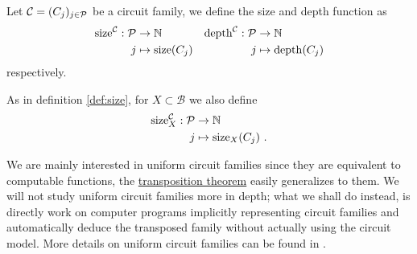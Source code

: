 \begin{definition}
  Let $\mathcal{C} = (C_j)_{j\in\mathcal{P}}$ be a circuit family, we
  define the size and
  depth function as
  \begin{align*}
    \operatorname{size}^{\mathcal{C}}:\mathcal{P}&\rightarrow\mathbb{N}  & \operatorname{depth}^{\mathcal{C}}:\mathcal{P}&\rightarrow\mathbb{N}\\
                   j&\mapsto\operatorname{size}(C_j) &    j&\mapsto\operatorname{depth}(C_j)
  \end{align*}
  respectively.

  As in definition \ref{def:size}, for $X\subset\mathcal{B}$ we also
  define
  \begin{align*}
    \operatorname{size}^{\mathcal{C}}_X:\mathcal{P}&\rightarrow\mathbb{N}\\
                     j&\mapsto\operatorname{size}_X(C_j)
                     \text{ .}
  \end{align*}
\end{definition}

We are mainly interested in uniform circuit families since they are
equivalent to computable functions, the
\hyperref[th:tellegen]{transposition theorem} easily generalizes to
them. We will not study uniform circuit families more in depth; what
we shall do instead, is directly work on computer programs implicitly
representing circuit families and automatically deduce the transposed
family without actually using the circuit model. More details on
uniform circuit families can be found in \cite{vollmer}.


%
